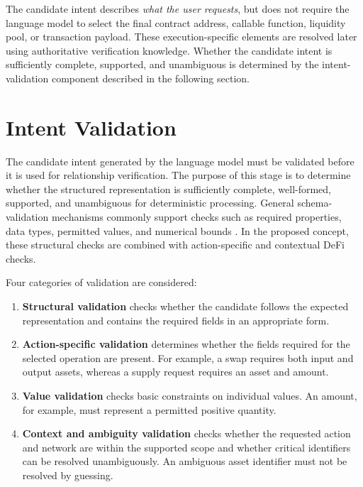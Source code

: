 The candidate intent describes \textit{what the user requests}, but does not
require the language model to select the final contract address, callable
function, liquidity pool, or transaction payload. These execution-specific
elements are resolved later using authoritative verification knowledge.
Whether the candidate intent is sufficiently complete, supported, and
unambiguous is determined by the intent-validation component described in
the following section.


\section{Intent Validation}
\label{sec:intent_validation}

The candidate intent generated by the language model must be validated before
it is used for relationship verification. The purpose of this stage is to
determine whether the structured representation is sufficiently complete,
well-formed, supported, and unambiguous for deterministic processing. General schema-validation mechanisms commonly support checks such as required
properties, data types, permitted values, and numerical bounds
\cite{jsonschema2020}. In the proposed concept, these structural checks are
combined with action-specific and contextual DeFi checks.

Four categories of validation are considered:

\begin{enumerate}

    \item \textbf{Structural validation} checks whether the candidate follows
    the expected representation and contains the required fields in an
    appropriate form.

    \item \textbf{Action-specific validation} determines whether the fields
    required for the selected operation are present. For example, a swap
    requires both input and output assets, whereas a supply request requires
    an asset and amount.

    \item \textbf{Value validation} checks basic constraints on individual
    values. An amount, for example, must represent a permitted positive
    quantity.

    \item \textbf{Context and ambiguity validation} checks whether the
    requested action and network are within the supported scope and whether
    critical identifiers can be resolved unambiguously. An ambiguous asset
    identifier must not be resolved by guessing.

\end{enumerate}

